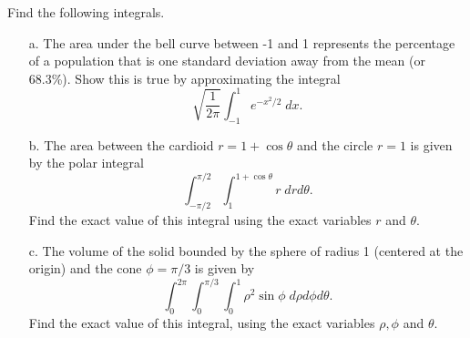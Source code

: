 {Find the following integrals.
\begin{enumerate}
\item[a.] The area under the bell curve between -1 and 1 represents the percentage of a population that is one standard deviation away from the mean (or 68.3\%).  Show this is true by approximating the integral 
\[ \sqrt{\frac{1}{2\pi}}\int_{-1}^1 e^{-x^2/2} \; dx.\]
\item[b.] The area between the cardioid $r=1+\cos\theta$ and the circle $r=1$ is given by the polar integral
\[\displaystyle \int_{-\pi/2}^{\pi/2} \int_1^{1+\cos\theta} r \; dr d\theta.\]
Find the exact value of this integral using the exact variables $r$ and $\theta$.
\item[c.] The volume of the solid bounded by the sphere of radius 1 (centered at the origin) and the cone $\phi=\pi/3$ is given by 
\[\int_0^{2\pi} \int_0^{\pi/3} \int_0^1 \rho^2 \sin \phi \; d\rho d\phi d\theta.\] 
Find the exact value of this integral, using the exact variables $\rho,\phi$ and $\theta$.
\end{enumerate}}
{}